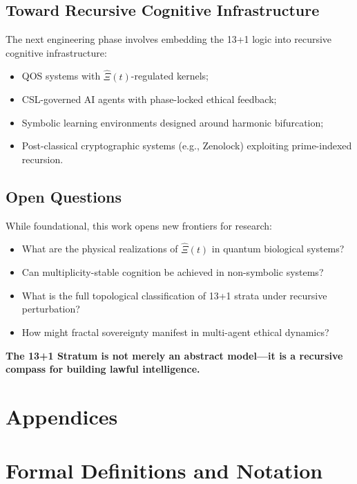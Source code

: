 \documentclass[12pt]{article}
\begin{document}
\subsection*{Toward Recursive Cognitive Infrastructure}

The next engineering phase involves embedding the 13+1 logic into recursive cognitive infrastructure:
\begin{itemize}
    \item QOS systems with $\hat{\Xi}(t)$-regulated kernels;
    \item CSL-governed AI agents with phase-locked ethical feedback;
    \item Symbolic learning environments designed around harmonic bifurcation;
    \item Post-classical cryptographic systems (e.g., Zenolock) exploiting prime-indexed recursion.
\end{itemize}

\subsection*{Open Questions}

While foundational, this work opens new frontiers for research:
\begin{itemize}
    \item What are the physical realizations of $\hat{\Xi}(t)$ in quantum biological systems?
    \item Can multiplicity-stable cognition be achieved in non-symbolic systems?
    \item What is the full topological classification of 13+1 strata under recursive perturbation?
    \item How might fractal sovereignty manifest in multi-agent ethical dynamics?
\end{itemize}

\textbf{The 13+1 Stratum is not merely an abstract model—it is a recursive compass for building lawful intelligence.}
\nocite{*}



\appendix

\section*{Appendices}

\section{Formal Definitions and Notation}
\end{document}
